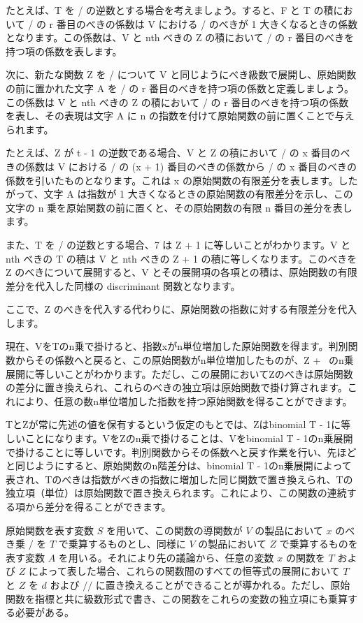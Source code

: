 \documentclass[a4paper,11pt,openany]{ltjsbook}
\begin{document}
たとえば、T を / の逆数とする場合を考えましょう。すると、F と T の積において / の r 番目のべきの係数は V における / のべきが 1 大きくなるときの係数となります。この係数は、V と nth べきの Z の積において / の r 番目のべきを持つ項の係数を表します。

次に、新たな関数 Z を / について V と同じようにべき級数で展開し、原始関数の前に置かれた文字 A を / の r 番目のべきを持つ項の係数と定義しましょう。この係数は V と nth べきの Z の積において / の r 番目のべきを持つ項の係数を表し、その表現は文字 A に n の指数を付けて原始関数の前に置くことで与えられます。

たとえば、Z が t - 1 の逆数である場合、V と Z の積において / の x 番目のべきの係数は V における / の (x + 1) 番目のべきの係数から / の x 番目のべきの係数を引いたものとなります。これは x の原始関数の有限差分を表します。したがって、文字 A は指数が 1 大きくなるときの原始関数の有限差分を示し、この文字の n 乗を原始関数の前に置くと、その原始関数の有限 n 番目の差分を表します。

また、T を / の逆数とする場合、7 は Z + 1 に等しいことがわかります。V と nth べきの T の積は V と nth べきの Z + 1 の積に等しくなります。このべきを Z のべきについて展開すると、V とその展開項の各項との積は、原始関数の有限差分を代入した同様の discriminant 関数となります。


ここで、Z のべきを代入する代わりに、原始関数の指数に対する有限差分を代入します。

現在、VをTのn乗で掛けると、指数xがn単位増加した原始関数を得ます。判別関数からその係数へと戻ると、この原始関数がn単位増加したものが、Z + \ のn乗展開に等しいことがわかります。ただし、この展開においてZのべきは原始関数の差分に置き換えられ、これらのべきの独立項は原始関数で掛け算されます。これにより、任意の数n単位増加した指数を持つ原始関数を得ることができます。

TとZが常に先述の値を保有するという仮定のもとでは、Zはbinomial T - 1に等しいことになります。VをZのn乗で掛けることは、Vをbinomial T - 1のn乗展開で掛けることに等しいです。判別関数からその係数へと戻す作業を行い、先ほどと同じようにすると、原始関数のn階差分は、binomial T - 1のn乗展開によって表され、Tのべきは指数がべきの指数に増加した同じ関数で置き換えられ、Tの独立項（単位）は原始関数で置き換えられます。これにより、この関数の連続する項から差分を得ることができます。

原始関数を表す変数 \( S \) を用いて、この関数の導関数が \( V \) の製品において \( x \) のべき乗 \( / \) を \( T \) で乗算するものとし、同様に \( V \) の製品において \( Z \) で乗算するものを表す変数 \( A \) を用いる。それにより先の議論から、任意の変数 \( x \) の関数を \( T \) および \( Z \) によって表した場合、これらの関数間のすべての恒等式の展開において \( T \) と \( Z \) を \( d \) および \( // \) に置き換えることができることが導かれる。ただし、原始関数を指標と共に級数形式で書き、この関数をこれらの変数の独立項にも乗算する必要がある。
\end{document}
